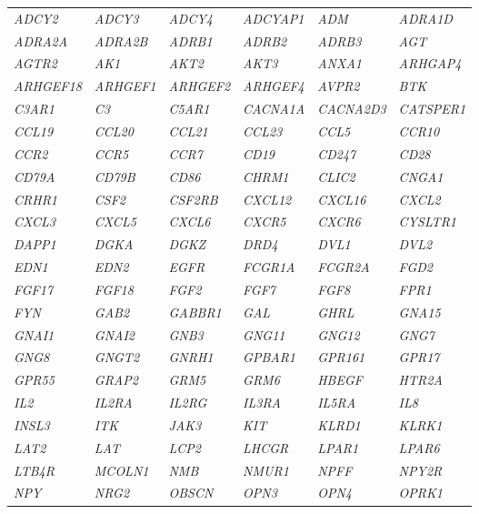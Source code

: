 {\begin{longtable}{>{\em}l>{\em}l>{\em}l>{\em}l>{\em}l>{\em}l}
  \hline
  \rowcolor{Cluster_Blue!20}
  ADCY2 & ADCY3 & ADCY4 & ADCYAP1 & ADM & ADRA1D \\ 
  \rowcolor{Cluster_Blue!15} 
  ADRA2A & ADRA2B & ADRB1 & ADRB2 & ADRB3 & AGT \\ 
  \rowcolor{Cluster_Blue!20} 
  AGTR2 & AK1 & AKT2 & AKT3 & ANXA1 & ARHGAP4 \\ 
  \rowcolor{Cluster_Blue!15} 
  ARHGEF18 & ARHGEF1 & ARHGEF2 & ARHGEF4 & AVPR2 & BTK \\ 
  \rowcolor{Cluster_Blue!20} 
  C3AR1 & C3 & C5AR1 & CACNA1A & CACNA2D3 & CATSPER1 \\ 
  \rowcolor{Cluster_Blue!15} 
  CCL19 & CCL20 & CCL21 & CCL23 & CCL5 & CCR10 \\ 
  \rowcolor{Cluster_Blue!20} 
  CCR2 & CCR5 & CCR7 & CD19 & CD247 & CD28 \\ 
  \rowcolor{Cluster_Blue!15} 
  CD79A & CD79B & CD86 & CHRM1 & CLIC2 & CNGA1 \\ 
  \rowcolor{Cluster_Blue!20} 
  CRHR1 & CSF2 & CSF2RB & CXCL12 & CXCL16 & CXCL2 \\ 
  \rowcolor{Cluster_Blue!15} 
  CXCL3 & CXCL5 & CXCL6 & CXCR5 & CXCR6 & CYSLTR1 \\ 
  \rowcolor{Cluster_Blue!20} 
  DAPP1 & DGKA & DGKZ & DRD4 & DVL1 & DVL2 \\ 
  \rowcolor{Cluster_Blue!15} 
  EDN1 & EDN2 & EGFR & FCGR1A & FCGR2A & FGD2 \\ 
  \rowcolor{Cluster_Blue!20} 
  FGF17 & FGF18 & FGF2 & FGF7 & FGF8 & FPR1 \\ 
  \rowcolor{Cluster_Blue!15} 
  FYN & GAB2 & GABBR1 & GAL & GHRL & GNA15 \\ 
  \rowcolor{Cluster_Blue!20} 
  GNAI1 & GNAI2 & GNB3 & GNG11 & GNG12 & GNG7 \\ 
  \rowcolor{Cluster_Blue!15} 
  GNG8 & GNGT2 & GNRH1 & GPBAR1 & GPR161 & GPR17 \\ 
  \rowcolor{Cluster_Blue!20} 
  GPR55 & GRAP2 & GRM5 & GRM6 & HBEGF & HTR2A \\ 
  \rowcolor{Cluster_Blue!15} 
  IL2 & IL2RA & IL2RG & IL3RA & IL5RA & IL8 \\ 
  \rowcolor{Cluster_Blue!20} 
  INSL3 & ITK & JAK3 & KIT & KLRD1 & KLRK1 \\ 
  \rowcolor{Cluster_Blue!15} 
  LAT2 & LAT & LCP2 & LHCGR & LPAR1 & LPAR6 \\ 
  \rowcolor{Cluster_Blue!20} 
  LTB4R & MCOLN1 & NMB & NMUR1 & NPFF & NPY2R \\ 
  \rowcolor{Cluster_Blue!15} 
  NPY & NRG2 & OBSCN & OPN3 & OPN4 & OPRK1 \\ 

\end{longtable}}
